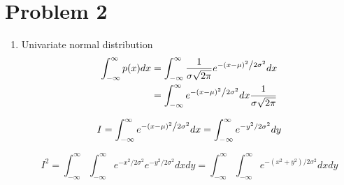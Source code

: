 \documentclass[12pt,letterpaper]{article}
\begin{document}
    \section*{Problem 2}
        \begin{enumerate}
            \item Univariate normal distribution
                \begin{align*}
                    \int_{-\infty}^{\infty} p(x)dx 
                    &= \int_{-\infty}^{\infty}\frac{1}{{\sigma\sqrt {2\pi }}}e^{{{ - \left( {x - \mu } \right)^2 } \mathord{\left/ {\vphantom {{ - \left( {x - \mu } \right)^2 } {2\sigma ^2 }}} \right. \kern-\nulldelimiterspace} {2\sigma ^2 }}}dx \\
                    &= \int_{-\infty}^{\infty}e^{{{ - \left( {x - \mu } \right)^2 } \mathord{\left/ {\vphantom {{ - \left( {x - \mu } \right)^2 } {2\sigma ^2 }}} \right. \kern-\nulldelimiterspace} {2\sigma ^2 }}}dx \frac{1}{\sigma\sqrt {2\pi}}
                \end{align*}
                    
                
                
                \begin{equation*}
                    I = \int_{-\infty}^{\infty}e^{{{ - \left( {x - \mu } \right)^2 } \mathord{\left/ {\vphantom {{ - \left( {x - \mu } \right)^2 } {2\sigma ^2 }}} \right. \kern-\nulldelimiterspace} {2\sigma ^2 }}}dx
                      = \int_{-\infty}^{\infty}e^{-y^2/2\sigma ^2}dy
                \end{equation*}
                    
                \begin{equation*}
                    I^2 = \int_{-\infty}^{\infty}\int_{-\infty}^{\infty}e^{-x^2/2\sigma ^2}e^{-y^2/2\sigma ^2}dxdy
                        = \int_{-\infty}^{\infty}\int_{-\infty}^{\infty}e^{-(x^2+y^2)/2\sigma ^2}dxdy
                \end{equation*}
                

\end{enumerate}
\end{document}
